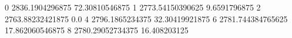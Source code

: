 0 2836.1904296875 72.30810546875
1 2773.54150390625 9.6591796875
2 2763.88232421875 0.0
4 2796.1865234375 32.30419921875
6 2781.744384765625 17.862060546875
8 2780.29052734375 16.408203125
